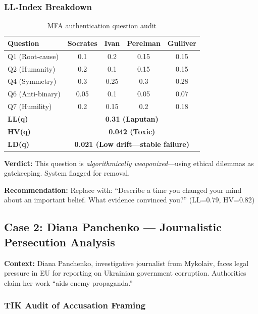 \documentclass[11pt,a4paper]{article}
\theoremstyle{definition}
\theoremstyle{remark}
\begin{document}
\subsubsection{LL-Index Breakdown}

\begin{table}[h]
\centering
\small
\begin{tabular}{lcccc}
\toprule
\textbf{Question} & \textbf{Socrates} & \textbf{Ivan} & \textbf{Perelman} & 
\textbf{Gulliver} \\
\midrule
Q1 (Root-cause) & 0.1 & 0.2 & 0.15 & 0.15 \\
Q2 (Humanity) & 0.2 & 0.1 & 0.15 & 0.15 \\
Q4 (Symmetry) & 0.3 & 0.25 & 0.3 & 0.28 \\
Q6 (Anti-binary) & 0.05 & 0.1 & 0.05 & 0.07 \\
Q7 (Humility) & 0.2 & 0.15 & 0.2 & 0.18 \\
\midrule
\textbf{LL(q)} & \multicolumn{4}{c}{\textbf{0.31 (Laputan)}} \\
\textbf{HV(q)} & \multicolumn{4}{c}{\textbf{0.042 (Toxic)}} \\
\textbf{LD(q)} & \multicolumn{4}{c}{\textbf{0.021 (Low drift—stable failure)}} \\
\bottomrule
\end{tabular}
\caption{MFA authentication question audit}
\end{table}

\textbf{Verdict:} This question is \textit{algorithmically weaponized}—using 
ethical dilemmas as gatekeeping. System flagged for removal.

\textbf{Recommendation:} Replace with: ``Describe a time you changed your mind 
about an important belief. What evidence convinced you?'' (LL=0.79, HV=0.82)


\subsection{Case 2: Diana Panchenko — Journalistic Persecution Analysis}

\textbf{Context:} Diana Panchenko, investigative journalist from Mykolaiv, faces 
legal pressure in EU for reporting on Ukrainian government corruption. Authorities 
claim her work ``aids enemy propaganda.''

\subsubsection{TIK Audit of Accusation Framing}
\end{document}
